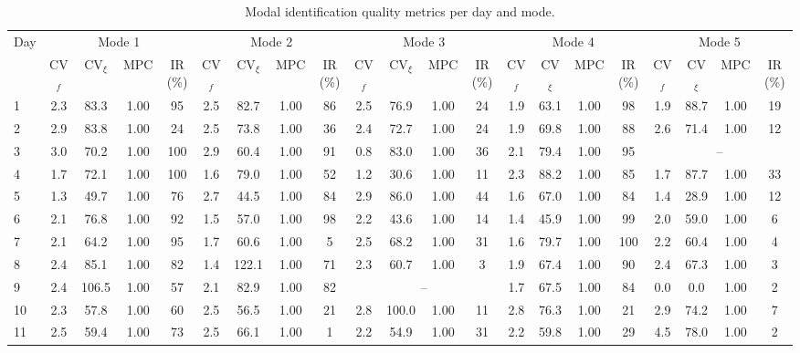 \begin{table}[htbp]
\centering
\small
\caption{Modal identification quality metrics per day and mode.}
\label{tab:validation}
\begin{tabular}{lcccccccccccccccccccc}
\toprule
Day & \multicolumn{4}{c}{Mode 1} & \multicolumn{4}{c}{Mode 2} & \multicolumn{4}{c}{Mode 3} & \multicolumn{4}{c}{Mode 4} & \multicolumn{4}{c}{Mode 5} \\
\cmidrule(lr){2-5}
\cmidrule(lr){6-9}
\cmidrule(lr){10-13}
\cmidrule(lr){14-17}
\cmidrule(lr){18-21}
& CV$_f$ & CV$_\xi$ & MPC & IR (\%) & CV$_f$ & CV$_\xi$ & MPC & IR (\%) & CV$_f$ & CV$_\xi$ & MPC & IR (\%) & CV$_f$ & CV$_\xi$ & MPC & IR (\%) & CV$_f$ & CV$_\xi$ & MPC & IR (\%) \\
\midrule
1 & 2.3 & 83.3 & 1.00 & 95 & 2.5 & 82.7 & 1.00 & 86 & 2.5 & 76.9 & 1.00 & 24 & 1.9 & 63.1 & 1.00 & 98 & 1.9 & 88.7 & 1.00 & 19 \\
2 & 2.9 & 83.8 & 1.00 & 24 & 2.5 & 73.8 & 1.00 & 36 & 2.4 & 72.7 & 1.00 & 24 & 1.9 & 69.8 & 1.00 & 88 & 2.6 & 71.4 & 1.00 & 12 \\
3 & 3.0 & 70.2 & 1.00 & 100 & 2.9 & 60.4 & 1.00 & 91 & 0.8 & 83.0 & 1.00 & 36 & 2.1 & 79.4 & 1.00 & 95 & \multicolumn{4}{c}{--} \\
4 & 1.7 & 72.1 & 1.00 & 100 & 1.6 & 79.0 & 1.00 & 52 & 1.2 & 30.6 & 1.00 & 11 & 2.3 & 88.2 & 1.00 & 85 & 1.7 & 87.7 & 1.00 & 33 \\
5 & 1.3 & 49.7 & 1.00 & 76 & 2.7 & 44.5 & 1.00 & 84 & 2.9 & 86.0 & 1.00 & 44 & 1.6 & 67.0 & 1.00 & 84 & 1.4 & 28.9 & 1.00 & 12 \\
6 & 2.1 & 76.8 & 1.00 & 92 & 1.5 & 57.0 & 1.00 & 98 & 2.2 & 43.6 & 1.00 & 14 & 1.4 & 45.9 & 1.00 & 99 & 2.0 & 59.0 & 1.00 & 6 \\
7 & 2.1 & 64.2 & 1.00 & 95 & 1.7 & 60.6 & 1.00 & 5 & 2.5 & 68.2 & 1.00 & 31 & 1.6 & 79.7 & 1.00 & 100 & 2.2 & 60.4 & 1.00 & 4 \\
8 & 2.4 & 85.1 & 1.00 & 82 & 1.4 & 122.1 & 1.00 & 71 & 2.3 & 60.7 & 1.00 & 3 & 1.9 & 67.4 & 1.00 & 90 & 2.4 & 67.3 & 1.00 & 3 \\
9 & 2.4 & 106.5 & 1.00 & 57 & 2.1 & 82.9 & 1.00 & 82 & \multicolumn{4}{c}{--} & 1.7 & 67.5 & 1.00 & 84 & 0.0 & 0.0 & 1.00 & 2 \\
10 & 2.3 & 57.8 & 1.00 & 60 & 2.5 & 56.5 & 1.00 & 21 & 2.8 & 100.0 & 1.00 & 11 & 2.8 & 76.3 & 1.00 & 21 & 2.9 & 74.2 & 1.00 & 7 \\
11 & 2.5 & 59.4 & 1.00 & 73 & 2.5 & 66.1 & 1.00 & 1 & 2.2 & 54.9 & 1.00 & 31 & 2.2 & 59.8 & 1.00 & 29 & 4.5 & 78.0 & 1.00 & 2 \\
\bottomrule
\end{tabular}
\end{table}